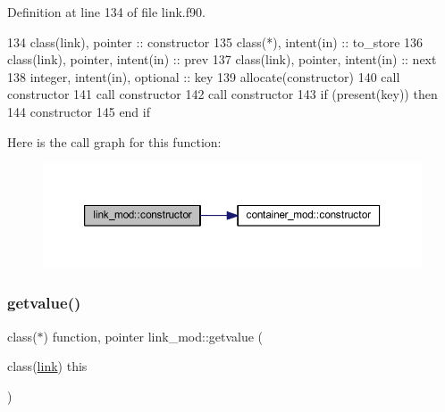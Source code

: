Definition at line 134 of file link.\+f90.


\begin{DoxyCode}
134     \textcolor{keywordtype}{class}(link), \textcolor{keywordtype}{pointer} :: constructor
135     \textcolor{keywordtype}{class}(*), \textcolor{keywordtype}{intent(in)} :: to\_store
136     \textcolor{keywordtype}{class}(link), \textcolor{keywordtype}{pointer}, \textcolor{keywordtype}{intent(in)} :: prev
137     \textcolor{keywordtype}{class}(link), \textcolor{keywordtype}{pointer}, \textcolor{keywordtype}{intent(in)} :: next
138     \textcolor{keywordtype}{integer}, \textcolor{keywordtype}{intent(in)}, \textcolor{keywordtype}{optional} :: key
139     \textcolor{keyword}{allocate}(constructor)
140     \textcolor{keyword}{call }constructor%
141     \textcolor{keyword}{call }constructor%
142     \textcolor{keyword}{call }constructor%
143     \textcolor{keywordflow}{if} (\textcolor{keyword}{present}(key)) \textcolor{keywordflow}{then}
144         constructor%
145 \textcolor{keywordflow}{    end if}
\end{DoxyCode}
Here is the call graph for this function\+:
\nopagebreak
\begin{figure}[H]
\begin{center}
\leavevmode
\includegraphics[width=350pt]{namespacelink__mod_ac5b4f1702d8edb10a4559f6f371dc797_cgraph}
\end{center}
\end{figure}
\mbox{\label{namespacelink__mod_aa2c8d19ee91797e19464fc7589cc2c39}} 
\subsubsection{\texorpdfstring{getvalue()}{getvalue()}}
{\footnotesize\ttfamily class($\ast$) function, pointer link\+\_\+mod\+::getvalue (\begin{DoxyParamCaption}\item[{class(\mbox{\hyperlink{structlink__mod_1_1link}{link}})}]{this }\end{DoxyParamCaption})\hspace{0.3cm}{\ttfamily [private]}}



